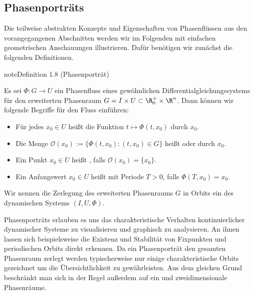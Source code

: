 \documentclass[letterpaper,10pt,english]{jupyterBook}
\begin{document}
\subsection{Phasenporträts}
\label{\detokenize{ode/fluesse:phasenportrats}}
\sphinxAtStartPar
Die teilweise abstrakten Konzepte und Eigenschaften von Phasenflüssen aus den vorangegangenen Abschnitten werden wir im Folgenden mit einfachen geometrischen Anschauungen illustrieren.
Dafür benötigen wir zunächst die folgenden Definitionen.
\label{ode/fluesse:definition-4}
\begin{sphinxadmonition}{note}{Definition 1.8 (Phasenporträt)}



\sphinxAtStartPar
Es sei \(\Phi:G\rightarrow U\) ein Phasenfluss eines gewöhnlichen Differentialgleichungssystems für den erweiterten Phasenraum \(G = I \times U\subset \R^+_0\times \R^n\).
Dann können wir folgende Begriffe für den Fluss einführen:
\begin{itemize}
\item {} 
\sphinxAtStartPar
Für jedes \(x_0\in U\) heißt die Funktion \(t\mapsto \Phi(t, x_0)\)  durch \(x_0\).

\item {} 
\sphinxAtStartPar
Die Menge \(\mathcal{O}(x_0) := \{\Phi(t, x_0): (t, x_0)\in G\}\) heißt  oder  durch \(x_0\).

\item {} 
\sphinxAtStartPar
Ein Punkt \(x_0 \in U\) heißt , falls \(\mathcal{O}(x_0) = \{x_0\}\).

\item {} 
\sphinxAtStartPar
Ein Anfangswert \(x_0\in U\) heißt  mit Periode \(T>0\), falls \(\Phi(T, x_0) = x_0\).

\end{itemize}

\sphinxAtStartPar
Wir nennen die Zerlegung des erweiterten Phasenraums \(G\) in Orbits ein  des dynamischen Systems \((I,U, \Phi)\).
\end{sphinxadmonition}

\sphinxAtStartPar
Phasenporträts erlauben es uns das charakteristische Verhalten kontinuierlicher dynamischer Systeme zu visualisieren und graphisch zu analysieren.
An ihnen lassen sich beispielsweise die Existenz und Stabilität von Fixpunkten und periodischen Orbits direkt erkennen.
Da ein Phasenporträt den gesamten Phasenraum zerlegt werden typischerweise nur einige charakteristische Orbits gezeichnet um die Übersichtlichkeit zu gewährleisten.
Aus dem gleichen Grund beschränkt man sich in der Regel außerdem auf ein\sphinxhyphen{} und zweidimensionale Phasenräume.
\end{document}
